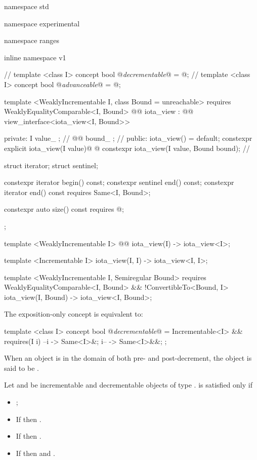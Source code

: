 \begin{codeblock}
namespace std { namespace experimental { namespace ranges { inline namespace v1 {
  // \expos
  template <class I>
  concept bool @\textit{decrementable}@ = @\seebelow@;
  // \expos
  template <class I>
  concept bool @\textit{advanceable}@ = @\seebelow@;

  template <WeaklyIncrementable I, class Bound = unreachable>
    requires WeaklyEqualityComparable<I, Bound>
  @@ iota_view : @@ view_interface<iota_view<I, Bound>> {
  private:
    I value_ {}; // \expos
    @@ bound_ {}; // \expos
  public:
    iota_view() = default;
    constexpr explicit iota_view(I value)@\added{;} @
    constexpr iota_view(I value, Bound bound); // \seebelow

    struct iterator;
    struct sentinel;

    constexpr iterator begin() const;
    constexpr sentinel end() const;
    constexpr iterator end() const requires Same<I, Bound>;

    constexpr auto size() const requires @\seebelow@;
  };

  template <WeaklyIncrementable I>
  @@ iota_view(I) -> iota_view<I>;

  template <Incrementable I>
  iota_view(I, I) -> iota_view<I, I>;

  template <WeaklyIncrementable I, Semiregular Bound>
    requires WeaklyEqualityComparable<I, Bound> && !ConvertibleTo<Bound, I>
  iota_view(I, Bound) -> iota_view<I, Bound>;
}}}}
\end{codeblock}

\pnum
The exposition-only  concept is equivalent to:
\begin{codeblock}
template <class I>
concept bool @\textit{decrementable}@ =
Incrementable<I> && requires(I i) {
  { --i } -> Same<I>&;
  { i-- } -> Same<I>&&;
};
\end{codeblock}

\pnum
When an object is in the domain of both pre- and post-decrement,
the object is said to be .

\pnum
Let  and  be incrementable and decrementable objects of type
.  is satisfied only if
\begin{itemize}
\item {};
\item If  then .
\item If  then .
\item If  then  and
.
\end{itemize}

